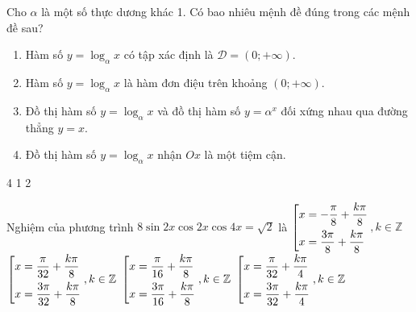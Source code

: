 \begin{ex}%
Cho $\alpha $ là một số thực dương khác 1. Có bao nhiêu mệnh đề đúng trong các mệnh đề sau?
\begin{enumerate}
\item Hàm số $y = \log_{\alpha}x$ có tập xác định là $\mathscr{D} = (0; + \infty)$.
\item Hàm số $y = \log_{\alpha}x$ là hàm đơn điệu trên khoảng $(0; + \infty)$.
\item Đồ thị hàm số $y = \log_{\alpha}x$ và đồ thị hàm số $y = {\alpha}^x$ đối xứng nhau qua đường thẳng $y = x$.
\item Đồ thị hàm số $y = \log_{\alpha}x$ nhận $Ox$ là một tiệm cận.
\end{enumerate}
\choice
{4}
{1}
{}
{2}
\end{ex}
\begin{ex}%
Nghiệm của phương trình $8\sin 2x\cos 2x\cos 4x = \sqrt{2}$ là
\choice
{$\left[\begin{aligned}
& x = - \dfrac{\pi}{8} + \dfrac{k\pi}{8} \\ 
& x = \dfrac{3\pi}{8} + \dfrac{k\pi}{8} \\\end{aligned}\right.$$, k\in \mathbb{Z}$}
{$\left[\begin{aligned}
& x = \dfrac{\pi}{32} + \dfrac{k\pi}{8} \\ 
& x = \dfrac{3\pi}{32} + \dfrac{k\pi}{8} \\\end{aligned}\right., k\in \mathbb{Z}$}
{$\left[\begin{aligned}
& x = \dfrac{\pi}{16} + \dfrac{k\pi}{8} \\ 
& x = \dfrac{3\pi}{16} + \dfrac{k\pi}{8} \\\end{aligned}\right., k\in \mathbb{Z}$}
{\True $\left[\begin{aligned}
& x = \dfrac{\pi}{32} + \dfrac{k\pi}{4} \\ 
& x = \dfrac{3\pi}{32} + \dfrac{k\pi}{4} \\\end{aligned}\right., k\in \mathbb{Z}$}
\end{ex}
